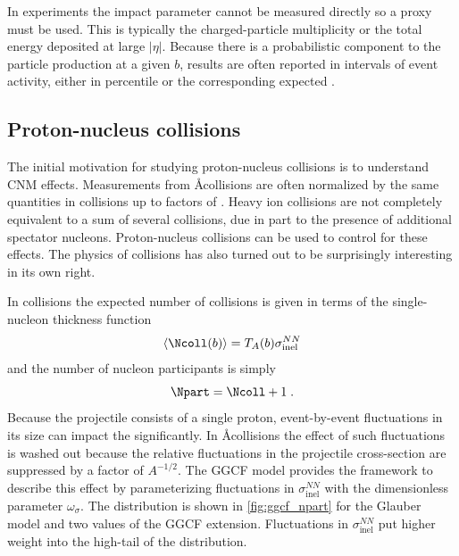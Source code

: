 In experiments the impact parameter cannot be measured directly so a proxy must be used.
This is typically the charged-particle multiplicity or the total energy deposited at large $|\eta|$.
Because there is a probabilistic component to the particle production at a given $b$, results are often reported in intervals of event activity, either in percentile or the corresponding expected \Npart.

\subsection{Proton-nucleus collisions}
The initial motivation for studying proton-nucleus collisions is to understand \ac{CNM} effects.
Measurements from \AA collisions are often normalized by the same quantities in \pp collisions up to factors of \Npart.
Heavy ion collisions are not completely equivalent to a sum of several \pp collisions, due in part to the presence of additional spectator nucleons.
Proton-nucleus collisions can be used to control for these effects.
The physics of \pA collisions has also turned out to be surprisingly interesting in its own right.

In \pA collisions the expected number of collisions is given in terms of the single-nucleon thickness function
\begin{equation}
  \langle \Ncoll(b) \rangle = T_A(b) \sigma^{NN}_\mathrm{inel}
\end{equation}
and the number of nucleon participants is simply
\begin{equation}
  \Npart = \Ncoll + 1 \;.
\end{equation}
Because the projectile consists of a single proton, event-by-event fluctuations in its size can impact the \Npart significantly.
In \AA collisions the effect of such fluctuations is washed out because the relative fluctuations in the projectile cross-section are suppressed by a factor of $A^{-1/2}$.
The \ac{GGCF} model provides the framework to describe this effect by parameterizing fluctuations in $\sigma^{NN}_\mathrm{inel}$ with the dimensionless parameter $\omega_\sigma$.
The \Npart distribution is shown in \cref{fig:ggcf_npart} for the Glauber model and two values of the \ac{GGCF} extension.
Fluctuations in $\sigma^{NN}_\mathrm{inel}$ put higher weight into the high-\Npart tail of the distribution.

